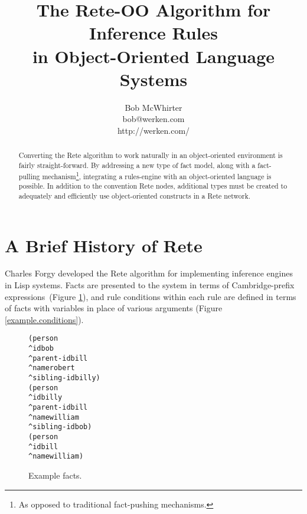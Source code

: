 \documentclass[10pt,twocolumn,letterpaper,colorhighlight]{article}
\newenvironment{codelisting}%
	{\begin{minipage}{250pt}\small\begin{alltt}}%
	{\end{alltt}\end{minipage}}
\begin{document}
\let\footnoterule\hrule
\setlength{\skip\footins}{10pt plus 5pt minus 3pt}

\makeatletter

\renewcommand{\@makefntext}[1]%
	{\noindent\makebox[1.8em][r]{\@makefnmark}#1}

\makeatother




\title{The Rete-OO Algorithm for Inference Rules\\in Object-Oriented Language Systems}

\author{Bob McWhirter\\bob@werken.com\\http://werken.com/}
\maketitle


\begin{abstract}
Converting the Rete algorithm to work naturally in an object-oriented
environment is fairly straight-forward.  By addressing a new type of
fact model, along with a fact-pulling mechanism\footnote {As opposed
to traditional fact-pushing mechanisms.}, integrating a rules-engine with
an object-oriented language is possible.  In addition to the
convention Rete nodes, additional types must be created to adequately
and efficiently use object-oriented constructs in a Rete network.
\end{abstract}



\section{A Brief History of Rete}

Charles Forgy developed the Rete algorithm \cite{forgy82rete} for
implementing inference engines in Lisp systems.  Facts are 
presented to the system in terms of Cambridge-prefix 
expressions~(Figure \ref{example.facts}), and rule conditions 
within each rule are defined in terms of facts with variables in place of various
arguments (Figure \ref{example.conditions}).

	\begin{figure}[hb]
	\begin{codelisting}
	(person 
	    ^id          bob    
	    ^parent-id   bill  
	    ^name        robert   
	    ^sibling-id  billy)
	(person 
	    ^id          billy  
	    ^parent-id   bill  
	    ^name        william  
	    ^sibling-id  bob)
	(person 
	    ^id          bill                    
	    ^name        william)
	\end{codelisting}

	\caption{Example facts.}
	\label{example.facts}
	\end{figure}
\end{document}
